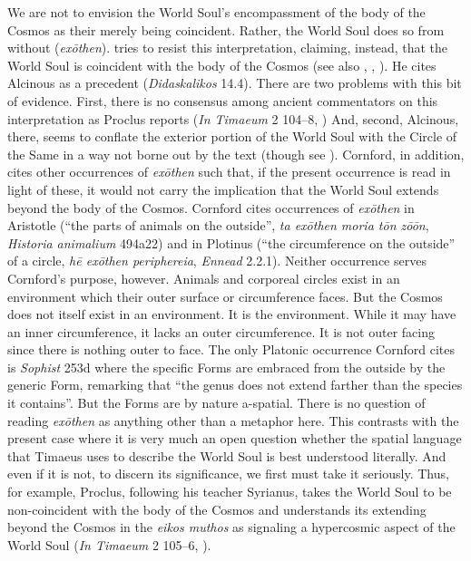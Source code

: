 We are not to envision the World Soul's encompassment of the body of the Cosmos as their merely being coincident. Rather, the World Soul does so from without (\emph{exōthen}). \citet[58]{Cornford:1935fk} tries to resist this interpretation, claiming, instead, that the World Soul is coincident with the body of the Cosmos (see also \citealt[105]{Taylor:1928qb}, \citealt[85]{Skemp:1942oc}, \citealt[70]{Robinson:1970lq}). He cites Alcinous as a precedent (\emph{Didaska\-likos} 14.4). There are two problems with this bit of evidence. First, there is no consensus among ancient commentators on this interpretation as Proclus reports (\emph{In Timaeum} 2 104--8, \citealt{Diehl:1903re}) And, second, Alcinous, there, seems to conflate the exterior portion of the World Soul with the Circle of the Same in a way not borne out by the text (though see \citealt[105]{Taylor:1928qb}). Cornford, in addition, cites other occurrences of \emph{exōthen} such that, if the present occurrence is read in light of these, it would not carry the implication that the World Soul extends beyond the body of the Cosmos. Cornford cites occurrences of \emph{exōthen} in Aristotle (``the parts of animals on the outside'', \emph{ta exōthen moria tōn zōōn}, \emph{Historia animalium} 494a22) and in Plotinus (``the circumference on the outside'' of a circle, \emph{hē exōthen periphereia}, \emph{Ennead} 2.2.1). Neither occurrence serves Cornford's purpose, however. Animals and corporeal circles exist in an environment which their outer surface or circumference faces. But the Cosmos does not itself exist in an environment. It is the environment. While it may have an inner circumference, it lacks an outer circumference. It is not outer facing since there is nothing outer to face. The only Platonic occurrence Cornford cites is \emph{Sophist} 253d where the specific Forms are embraced from the outside by the generic Form, remarking that ``the genus does not extend farther than the species it contains''. But the Forms are by nature a-spatial. There is no question of reading \emph{exōthen} as anything other than a metaphor here. This contrasts with the present case where it is very much an open question whether the spatial language that Timaeus uses to describe the World Soul is best understood literally. And even if it is not, to discern its significance, we first must take it seriously. Thus, for example, Proclus, following his teacher Syrianus, takes the World Soul to be non-coincident with the body of the Cosmos and understands its extending beyond the Cosmos in the \emph{eikos muthos} as signaling a hypercosmic aspect of the World Soul (\emph{In Timaeum} 2 105--6, \citealt{Diehl:1903re}).

